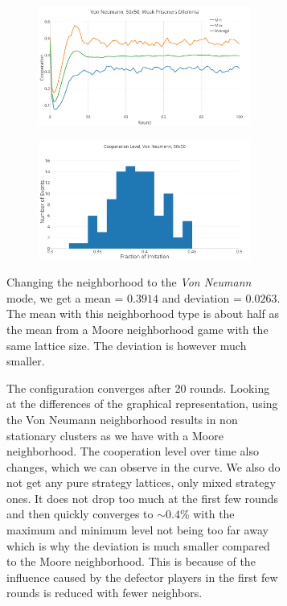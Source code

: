 \documentclass[a4paper, 11pt]{article}
\begin{document}
\begin{figure}[H]
\begin{subfigure}{.55\textwidth}
	\begin{subfigure}{1\textwidth}
		\includegraphics[width=1\linewidth]{PDVonNeumann50x50}
	\end{subfigure}

	\begin{subfigure}{1\textwidth}
		\includegraphics[width=1\linewidth]{PDVonNeumann50x50HG}
	\end{subfigure}
\end{subfigure}%
\begin{subfigure}{.45\textwidth}
	Changing the neighborhood to the \textit{Von Neumann} mode, we get a mean = $0.3914$ and deviation = $0.0263$. The mean with this neighborhood type is about half as the mean from a Moore neighborhood game with the same lattice size. The deviation is however much smaller.
	
	The configuration converges after 20 rounds. Looking at the differences of the graphical representation, using the Von Neumann neighborhood results in non stationary clusters as we have with a Moore neighborhood. The cooperation level over time also changes, which we can observe in the curve. We also do not get any pure strategy lattices, only mixed strategy ones. It does not drop too much at the first few rounds and then quickly converges to $\sim 0.4\%$ with the maximum and minimum level not being too far away which is why the deviation is much smaller compared to the Moore neighborhood.  This is because of the influence caused by the defector players in the first few rounds is reduced with fewer neighbors.
	
	
\end{subfigure}

\end{figure}
\end{document}
